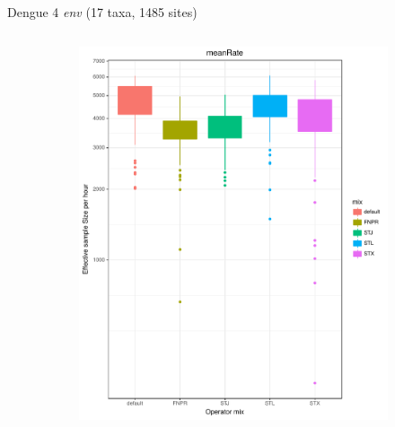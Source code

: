 \documentclass[newPxFont,numfooter,sectionpages]{beamer}
\begin{document}
\begin{frame}{Dengue 4 \textit{env} (17 taxa, 1485 sites)}
\begin{figure}
\begin{column}{0.5\textwidth}
\begin{figure}
     \includegraphics[width=\textwidth]{figures/ESS_hour_meanRate_dengue4.pdf} \\
     \end{figure}
\end{column}
\end{figure}
\end{frame}
\end{document}
